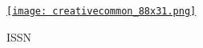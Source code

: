 \clearpage
\thispagestyle{empty}


\vfill
\begin{flushleft}
	\href{http://creativecommons.org/licenses/by-sa/4.0/}{\texttt{[image: creativecommon\_88x31.png]}}
\end{flushleft}%
\begin{flushright}
	\textcolor{gfzblue}{ISSN \rstIssn}
\end{flushright}
